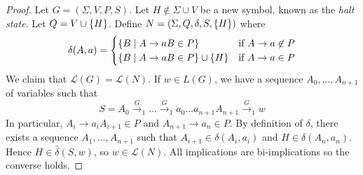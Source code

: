 \begin{proof}
	Let \( G = (\Sigma, V, P, S) \).
	Let \( H \not\in \Sigma \cup V \) be a new symbol, known as the \emph{halt state}.
	Let \( Q = V \cup \qty{H} \).
	Define \( N = (\Sigma, Q, \delta, S, \qty{H}) \) where
	\[ \delta(A,a) = \begin{cases}
		\qty{B \mid A \to aB \in P} & \text{if } A \to a \not\in P \\
		\qty{B \mid A \to aB \in P} \cup \qty{H} & \text{if } A \to a \in P
	\end{cases} \]
	We claim that \( \mathcal L(G) = \mathcal L(N) \).
	If \( w \in L(G) \), we have a sequence \( A_0, \dots, A_{n+1} \) of variables such that
	\[ S = A_0 \xrightarrow G_1 \dots \xrightarrow G_1 a_0\dots a_{n+1} A_{n+1} \xrightarrow G_1 w \]
	In particular, \( A_i \to a_i A_{i+1} \in P \) and \( A_{n+1} \to a_n \in P \).
	By definition of \( \delta \), there exists a sequence \( A_1, \dots, A_{n+1} \) such that \( A_{i+1} \in \delta(A_i, a_i) \) and \( H \in \delta(A_n, a_n) \).
	Hence \( H \in \hat\delta(S,w) \), so \( w \in \mathcal L(N) \).
	All implications are bi-implications so the converse holds.
\end{proof}
